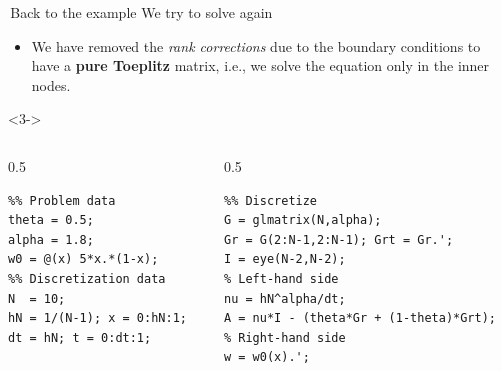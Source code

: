 \documentclass[aspectratio=169,xcolor=dvipsnames]{beamer}
\begin{document}
\begin{frame}[fragile]{\faHammer\,Back to the example}
We try to solve again
\begin{itemize}
	\item[\faCogs]<2-> We have removed the \emph{rank corrections} due to the boundary conditions to have a \textbf{pure Toeplitz} matrix, i.e., we solve the equation only in the inner nodes.
\end{itemize}
\begin{onlyenv}<3->\vspace{-1.5em}
\begin{columns}[t]
\begin{column}{0.5\columnwidth}
\begin{verbatim}
%% Problem data
theta = 0.5; 
alpha = 1.8;
w0 = @(x) 5*x.*(1-x);
%% Discretization data
N  = 10;
hN = 1/(N-1); x = 0:hN:1;
dt = hN; t = 0:dt:1;
\end{verbatim}
\end{column}
\begin{column}{0.5\columnwidth}
\begin{verbatim}
%% Discretize
G = glmatrix(N,alpha);
Gr = G(2:N-1,2:N-1); Grt = Gr.';
I = eye(N-2,N-2);
% Left-hand side
nu = hN^alpha/dt;
A = nu*I - (theta*Gr + (1-theta)*Grt);
% Right-hand side
w = w0(x).'; 
\end{verbatim}
\end{column}
\end{columns}

\end{onlyenv}
\end{frame}
\end{document}
